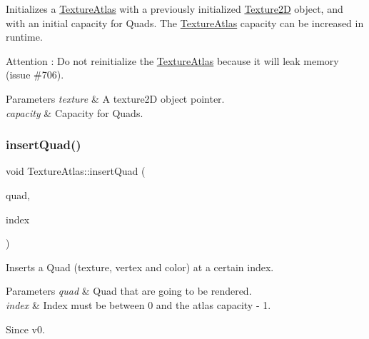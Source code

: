 Initializes a \hyperlink{classTextureAtlas}{Texture\+Atlas} with a previously initialized \hyperlink{classTexture2D}{Texture2D} object, and with an initial capacity for Quads. The \hyperlink{classTextureAtlas}{Texture\+Atlas} capacity can be increased in runtime. \begin{DoxyAttention}{Attention}
\+: Do not reinitialize the \hyperlink{classTextureAtlas}{Texture\+Atlas} because it will leak memory (issue \#706). 
\end{DoxyAttention}

\begin{DoxyParams}{Parameters}
{\em texture} & A texture2D object pointer. \\
\hline
{\em capacity} & Capacity for Quads. \\
\hline
\end{DoxyParams}
\mbox{\label{classTextureAtlas_a7dc5079e603e3b7e78e73a1094d1560b}} 
\subsubsection{\texorpdfstring{insert\+Quad()}{insertQuad()}\hspace{0.1cm}{\footnotesize\ttfamily [1/2]}}
{\footnotesize\ttfamily void Texture\+Atlas\+::insert\+Quad (\begin{DoxyParamCaption}\item[{\hyperlink{structV3F__C4B__T2F__Quad}{V3\+F\+\_\+\+C4\+B\+\_\+\+T2\+F\+\_\+\+Quad} $\ast$}]{quad,  }\item[{ssize\+\_\+t}]{index }\end{DoxyParamCaption})}

Inserts a Quad (texture, vertex and color) at a certain index. 
\begin{DoxyParams}{Parameters}
{\em quad} & Quad that are going to be rendered. \\
\hline
{\em index} & Index must be between 0 and the atlas capacity -\/ 1. \\
\hline
\end{DoxyParams}
\begin{DoxySince}{Since}
v0. 
\end{DoxySince}
\mbox{\label{classTextureAtlas_a7dc5079e603e3b7e78e73a1094d1560b}} 
